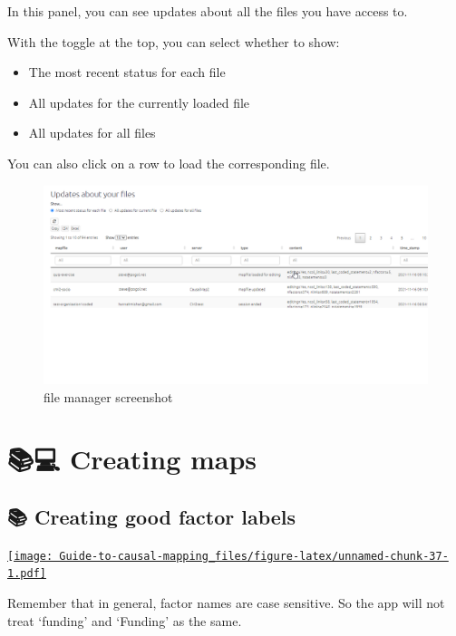 \documentclass[
]{book}
\providecommand{\tightlist}{%
  \setlength{\itemsep}{0pt}\setlength{\parskip}{0pt}}
\begin{document}
In this panel, you can see updates about all the files you have access to.

With the toggle at the top, you can select whether to show:

\begin{itemize}
\tightlist
\item
  The most recent status for each file
\item
  All updates for the currently loaded file
\item
  All updates for all files
\end{itemize}

You can also click on a row to load the corresponding file.

\begin{figure}
\centering
\includegraphics[width=6.77083in,height=\textheight]{_assets/file manager screenshot-16376049547992.png}
\caption{file manager screenshot}
\end{figure}

\hypertarget{part-creating-maps}{%
\part{📚💻 Creating maps}\label{part-creating-maps}}

\hypertarget{creating-good-factor-labels}{%
\chapter{📚 Creating good factor labels}\label{creating-good-factor-labels}}

\href{https://player.vimeo.com/video/580212681}{\texttt{[image: Guide-to-causal-mapping\_files/figure-latex/unnamed-chunk-37-1.pdf]}}

Remember that in general, factor names are case sensitive. So the app will not treat `funding' and `Funding' as the same.
\end{document}
